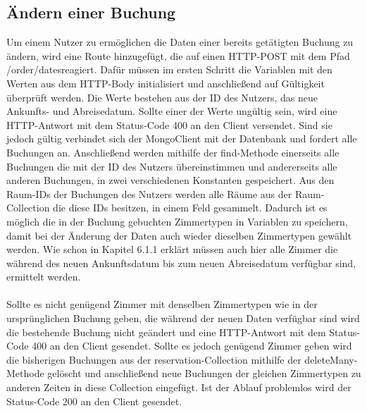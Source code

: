 \subsection{Ändern einer Buchung}
Um einem Nutzer zu ermöglichen die Daten einer bereits getätigten Buchung zu ändern, wird eine Route hinzugefügt, die auf einen HTTP-POST mit dem Pfad \glqq /order/dates\grqq \thinspace reagiert. Dafür müssen im ersten Schritt die Variablen mit den Werten aus dem HTTP-Body initialisiert und anschließend auf Gültigkeit überprüft werden. Die Werte bestehen aus der ID des Nutzers, das neue Ankunfts- und Abreisedatum. Sollte einer der Werte ungültig sein, wird eine HTTP-Antwort mit dem Status-Code 400 an den Client versendet. Sind sie jedoch gültig verbindet sich der MongoClient mit der Datenbank und fordert alle Buchungen an. Anschließend werden mithilfe der find-Methode einerseits alle Buchungen die mit der ID des Nutzers übereinstimmen und andererseits alle anderen Buchungen, in zwei verschiedenen Konstanten gespeichert. Aus den Raum-IDs der Buchungen des Nutzers werden alle Räume aus der Raum-Collection die diese IDs besitzen, in einem Feld gesammelt. Dadurch ist es möglich die in der Buchung gebuchten Zimmertypen in Variablen zu speichern, damit bei der Änderung der Daten auch wieder dieselben Zimmertypen gewählt werden. Wie schon in Kapitel 6.1.1 erklärt müssen auch hier alle Zimmer die während des neuen Ankunftsdatum bis zum neuen Abreisedatum verfügbar sind, ermittelt werden.
\\
\\
Sollte es nicht genügend Zimmer mit denselben Zimmertypen wie in der ursprünglichen Buchung geben, die während der neuen Daten verfügbar sind wird die bestehende Buchung nicht geändert und eine HTTP-Antwort mit dem Status-Code 400 an den Client gesendet. Sollte es jedoch genügend Zimmer geben wird die bisherigen Buchungen aus der \glqq reservation\grqq-Collection mithilfe der \glqq deleteMany\grqq-Methode gelöscht und anschließend neue Buchungen der gleichen Zimmertypen zu anderen Zeiten in diese Collection eingefügt. Ist der Ablauf problemlos wird der Status-Code 200 an den Client gesendet.

